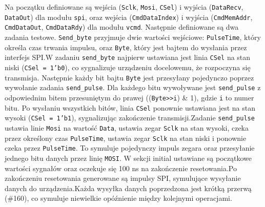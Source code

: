 \documentclass[12pt, a4paper]{article}
\begin{document}
Na początku definiowane są wejścia (\texttt{Sclk}, \texttt{Mosi}, \texttt{CSel}) i wyjścia (\texttt{DataRecv}, \texttt{DataOut}) dla modułu \texttt{spi}, oraz wejścia (\texttt{CmdDataIndex}) i wyjścia (\texttt{CmdMemAddr}, \texttt{CmdDataOut}, \texttt{CmdDataRdy}) dla modułu \texttt{vcmd}. Następnie definiowane są dwa zadania testowe. \texttt{Send_byte} przyjmuje dwie wartości wejściowe: \texttt{PulseTime}, który określa czas trwania impulsu, oraz \texttt{Byte}, który jest bajtem do wysłania przez interfejs SPI.W zadaniu \texttt{send_byte} najpierw ustawiana jest linia \texttt{CSel} na stan niski (\texttt{CSel = 1'b0}), co sygnalizuje urządzeniu docelowemu, że rozpoczyna się transmisja. Następnie każdy bit bajtu \texttt{Byte} jest przesyłany pojedynczo poprzez wywołanie zadania \texttt{send\_pulse}. Dla każdego bitu wywoływane jest \texttt{send\_pulse} z odpowiednim bitem przesuniętym do prawej ((\texttt{Byte>>i}) \& 1), gdzie \texttt{i} to numer bitu. Po wysłaniu wszystkich bitów, linia \texttt{CSel} ponownie ustawiana jest na stan wysoki (\texttt{CSel = 1'b1}), sygnalizując zakończenie transmisji.Zadanie \texttt{send_pulse} ustawia linie \texttt{Mosi} na wartość \texttt{Data}, ustawia zegar \texttt{Sclk} na stan wysoki, czeka przez określony czas \texttt{PulseTime}, ustawia zegar \texttt{Sclk} na stan niski i ponownie czeka przez \texttt{PulseTime}. To symuluje pojedynczy impuls zegara oraz przesyłanie jednego bitu danych przez linię \texttt{MOSI}.
\newline{}
W sekcji initial ustawiane są początkowe wartości sygnałów oraz oczekuje się 100 ns na zakończenie resetowania.Po zakończeniu resetowania generowane są impulsy SPI, symulujące wysyłanie danych do urządzenia.Każda wysyłka danych poprzedzona jest krótką przerwą (\#160), co symuluje niewielkie opóźnienie między kolejnymi operacjami.
\end{document}
